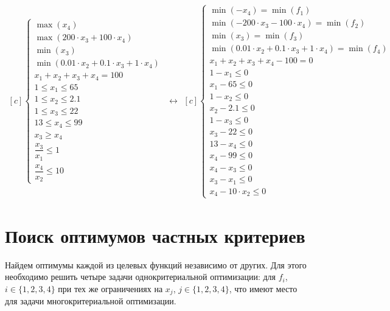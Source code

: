\begin{equation*}
	\begin{aligned}[c]
		\begin{cases}
		\max(x_4) \\
		\max(200 \cdot x_3 + 100 \cdot x_4) \\
		\min(x_3) \\
		\min(0.01 \cdot x_2 + 0.1 \cdot x_3 + 1 \cdot x_4) \\
		x_1 + x_2 + x_3 + x_4 = 100 \\
		1 \leq x_1 \leq 65 \\
		1 \leq x_2 \leq 2.1 \\
		1 \leq x_3 \leq 22 \\
		13 \leq x_4 \leq 99 \\
		x_3 \geq x_4 \\
		\dfrac{x_3}{x_1} \leq 1 \\
		\dfrac{x_4}{x_2} \leq 10
		\end{cases}
	\end{aligned}
	\leftrightarrow
	\begin{aligned}[c]
		\begin{cases}
		\min(-x_4) = \min(f_1) \\
		\min(-200 \cdot x_3 - 100 \cdot x_4) = \min(f_2) \\
		\min(x_3) = \min(f_3) \\
		\min(0.01 \cdot x_2 + 0.1 \cdot x_3 + 1 \cdot x_4) = \min(f_4) \\
		x_1 + x_2 + x_3 + x_4 - 100 = 0 \\
		1 - x_1 \leq 0 \\
		x_1 - 65 \leq 0 \\
		1 - x_2 \leq 0 \\
		x_2 - 2.1 \leq 0 \\
		1 - x_3 \leq 0 \\
		x_3 - 22 \leq 0 \\
		13 - x_4 \leq 0 \\
		x_4 - 99 \leq 0 \\
		x_4 - x_3 \leq 0 \\
		x_3 - x_1 \leq 0 \\
		x_4 - 10 \cdot x_2 \leq 0
		\end{cases}
	\end{aligned}
\end{equation*}

\newpage

\section{Поиск оптимумов частных критериев}
Найдем оптимумы каждой из целевых функций независимо от других. Для этого необходимо решить четыре задачи однокритериальной оптимизации: для $f_i$, $i \in \{1,2,3,4\}$ при тех же ограничениях на $x_j$, $j \in \{1, 2, 3, 4\}$, что имеют место для задачи многокритериальной оптимизации.

